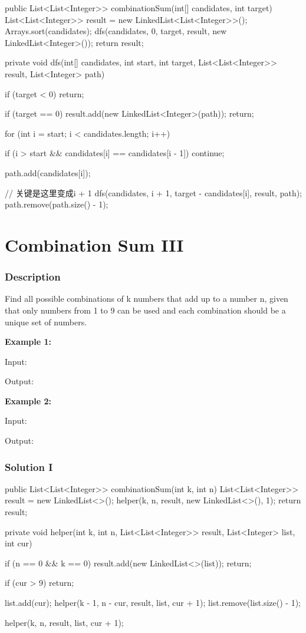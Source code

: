 \begin{Code}
public List<List<Integer>> combinationSum(int[] candidates, int target) {
    List<List<Integer>> result = new LinkedList<List<Integer>>();
    Arrays.sort(candidates);
    dfs(candidates, 0, target, result, new LinkedList<Integer>());
    return result;
}

private void dfs(int[] candidates, int start, int target, List<List<Integer>> result, List<Integer> path) {
    if (target < 0) {
        return;
    }

    if (target == 0) {
        result.add(new LinkedList<Integer>(path));
        return;
    }

    for (int i = start; i < candidates.length; i++) {
        if (i > start && candidates[i] == candidates[i - 1]) {
            continue;
        }

        path.add(candidates[i]);

        // 关键是这里变成i + 1
        dfs(candidates, i + 1, target - candidates[i], result, path);
        path.remove(path.size() - 1);
    }
}
\end{Code}

\newpage

\section{Combination Sum III} %

\subsubsection{Description}
Find all possible combinations of k numbers that add up to a number n, given that only numbers from 1 to 9 can be used and each combination should be a unique set of numbers.

\textbf{Example 1:}

Input: 

Output: \code{[[1,2,4]]}

\textbf{Example 2:}

Input: 

Output: \code{[[1,2,6], [1,3,5], [2,3,4]]}

\subsubsection{Solution I}

\begin{Code}
public List<List<Integer>> combinationSum(int k, int n) {
    List<List<Integer>> result = new LinkedList<>();
    helper(k, n, result, new LinkedList<>(), 1);
    return result;
}

private void helper(int k, int n, List<List<Integer>> result, List<Integer> list, int cur) {
    if (n == 0 && k == 0) {
        result.add(new LinkedList<>(list));
        return;
    }

    if (cur > 9) {
        return;
    }

    list.add(cur);
    helper(k - 1, n - cur, result, list, cur + 1);
    list.remove(list.size() - 1);

    helper(k, n, result, list, cur + 1);
}
\end{Code}

